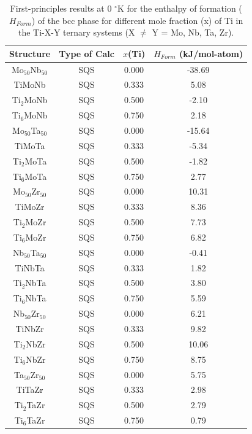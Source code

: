 \newpage
\begin{table}[H]
	\caption{First-principles results at 0 $^{\circ}$K for the enthalpy of formation ($H_{Form}$) of the bcc phase for different mole fraction (x) of Ti in the Ti-X-Y ternary systems (X $\neq$ Y = Mo, Nb, Ta, Zr).}
	\centering
	\begin{tabular}{ c c c c }
		\hline
		Structure & Type of Calc & $x$(Ti) & $H_{Form}$ (kJ/mol-atom)\\
		\hline
		Mo$_{50}$Nb$_{50}$ & SQS & 0.000 & -38.69\\
		TiMoNb & SQS & 0.333 & 5.08\\
		Ti$_{2}$MoNb & SQS & 0.500 & -2.10\\
		Ti$_{6}$MoNb & SQS & 0.750 & 2.18\\
		Mo$_{50}$Ta$_{50}$ & SQS & 0.000 & -15.64\\
		TiMoTa & SQS & 0.333 & -5.34\\
		Ti$_{2}$MoTa & SQS & 0.500 & -1.82\\
		Ti$_{6}$MoTa & SQS & 0.750 & 2.77\\
		Mo$_{50}$Zr$_{50}$ & SQS & 0.000 & 10.31\\
		TiMoZr & SQS & 0.333 & 8.36\\
		Ti$_{2}$MoZr & SQS & 0.500 & 7.73\\
		Ti$_{6}$MoZr & SQS & 0.750 & 6.82\\
		Nb$_{50}$Ta$_{50}$ & SQS & 0.000 & -0.41\\
		TiNbTa & SQS & 0.333 & 1.82\\
		Ti$_{2}$NbTa & SQS & 0.500 & 3.80\\
		Ti$_{6}$NbTa & SQS & 0.750 & 5.59\\
		Nb$_{50}$Zr$_{50}$ & SQS & 0.000 & 6.21\\
		TiNbZr & SQS & 0.333 & 9.82\\
		Ti$_{2}$NbZr & SQS & 0.500 & 10.06\\
		Ti$_{6}$NbZr & SQS & 0.750 & 8.75\\
		Ta$_{50}$Zr$_{50}$ & SQS & 0.000 & 5.75\\
		TiTaZr & SQS & 0.333 & 2.98\\
		Ti$_{2}$TaZr & SQS & 0.500 & 2.79\\
		Ti$_{6}$TaZr & SQS & 0.750 & 0.79\\
		\hline
	\end{tabular}
	\label{Ch3-table:ternhform}
\end{table}
\clearpage

